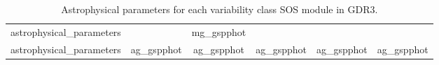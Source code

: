 \documentclass[12pt,a4paper]{article}
\begin{document}
\begin{table}[h]
\begin{subtable}[h]{0.45\textwidth}
\begin{tabular}{lccccc}
\multicolumn{1}{l|}{astrophysical\_parameters} &                                    & mg\_gspphot            &                             &                                          &                            \\
\multicolumn{1}{l|}{astrophysical\_parameters} &                ag\_gspphot                    &     ag\_gspphot                &                                ag\_gspphot           &        ag\_gspphot                     &            ag\_gspphot                              \\
\hline
\end{tabular}
        \caption{}
        \label{tab:week2}
     \end{subtable}
     \caption{Astrophysical parameters for each variability class SOS module in GDR3.}
     \label{tab:temps}
\end{table}
\end{document}

